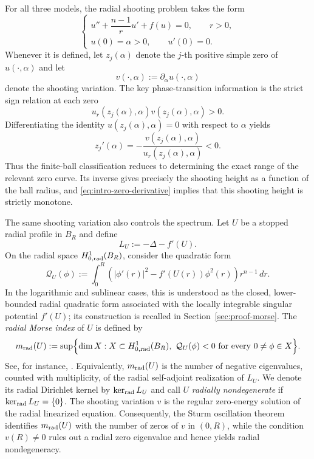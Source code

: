 \documentclass[11pt]{article}
\begin{document}
For all three models, the radial shooting problem takes the form
\begin{equation}
 \begin{cases}
 u''+\dfrac{n-1}{r}u'+f(u)=0,\qquad  r>0,\\[4pt]
 u(0)=\alpha>0,\qquad u'(0)=0.
 \end{cases}
 \label{eq:intro-shooting-unified}
\end{equation}
Whenever it is defined, let $z_j(\alpha)$ denote the $j$-th positive simple
zero of $u(\cdot,\alpha)$ and let
\[
 v(\cdot,\alpha):=\partial_\alpha u(\cdot,\alpha)
\]
denote the shooting variation.  The key phase-transition information is
the strict sign relation at each zero
\begin{equation*}
 u_r(z_j(\alpha),\alpha)v(z_j(\alpha),\alpha)>0.
\end{equation*}
Differentiating the identity $u(z_j(\alpha),\alpha)=0$ with respect to $\alpha$ yields
\begin{equation}\label{eq:intro-zero-derivative}
 z_j'(\alpha)
 =-\frac{v(z_j(\alpha),\alpha)}
         {u_r(z_j(\alpha),\alpha)}<0.
\end{equation}
Thus the finite-ball classification reduces to determining the exact
range of the relevant zero curve. Its inverse gives precisely the
shooting height as a function of the ball radius, and
\eqref{eq:intro-zero-derivative} implies that this shooting height is strictly monotone.

The same shooting variation also controls the spectrum. Let $U$ be a stopped
radial profile in $B_R$ and define
\[
 L_U:=-\Delta-f'(U).
\]
On the radial space $H^1_{0,{\rm rad}}(B_R)$, consider the quadratic
form
\begin{equation}\label{eq:intro-radial-form}
 \mathcal Q_U(\phi)
 :=\int_0^R\left(|\phi'(r)|^2-f'(U(r))\phi^2(r)\right)
 r^{n-1}\,dr.
\end{equation}
In the logarithmic and sublinear cases, this is understood as the
closed, lower-bounded radial quadratic form associated with the
locally integrable singular potential $f'(U)$; its construction is recalled in
Section~\ref{sec:proof-morse}.  The \emph{radial Morse index} of $U$ is defined by
\begin{equation*}
\begin{aligned}
 m_{\rm rad}(U)
 :=\sup\Bigl\{\dim X:X\subset H^1_{0,{\rm rad}}(B_R),\
 \mathcal Q_U(\phi)<0\ \hbox{for every }0\ne\phi\in X\Bigr\}.
\end{aligned}
\end{equation*}
See, for instance, \cite{DIP17,DIP17',HRS11}.
Equivalently, $m_{\rm rad}(U)$ is the number of negative eigenvalues, counted with
multiplicity, of the radial self-adjoint realization of $L_U$. We denote its radial Dirichlet kernel by $\ker_{\rm rad}L_U$ and call $U$ \emph{radially nondegenerate} if $\ker_{\rm rad}L_U=\{0\}$. The shooting
variation $v$ is the regular zero-energy solution of the radial
linearized equation. Consequently, the Sturm oscillation theorem
identifies ${m_{\rm rad}}(U)$ with the number of zeros of $v$ in
$(0,R)$, while the condition $v(R)\ne0$ rules out a radial zero
eigenvalue and hence yields radial nondegeneracy.
\end{document}
